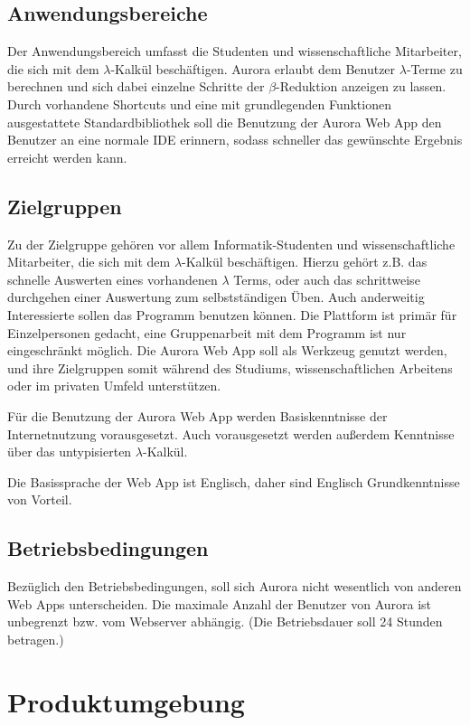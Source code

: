 \documentclass[parskip=full,11pt,twoside]{scrartcl}
\begin{document}
\subsection{Anwendungsbereiche}

Der Anwendungsbereich umfasst die Studenten und wissenschaftliche Mitarbeiter, die sich mit dem $\lambda$-Kalkül beschäftigen. Aurora erlaubt dem Benutzer $\lambda$-Terme zu berechnen und sich dabei einzelne Schritte der $\beta$-Reduktion anzeigen zu lassen. Durch vorhandene Shortcuts und eine mit grundlegenden Funktionen ausgestattete Standardbibliothek soll die Benutzung der Aurora Web App den Benutzer an eine normale IDE erinnern, sodass schneller das gewünschte Ergebnis erreicht werden kann.

\subsection{Zielgruppen}

Zu der Zielgruppe gehören vor allem Informatik-Studenten und wissenschaftliche Mitarbeiter, die sich mit dem $\lambda$-Kalkül beschäftigen. Hierzu gehört z.B. das schnelle Auswerten eines vorhandenen $\lambda$ Terms, oder auch das schrittweise durchgehen einer Auswertung zum selbstständigen Üben. Auch anderweitig Interessierte sollen das Programm benutzen können.
Die Plattform ist primär für Einzelpersonen gedacht, eine Gruppenarbeit mit dem Programm ist nur eingeschränkt möglich. Die Aurora Web App soll als Werkzeug genutzt werden, und ihre Zielgruppen somit während des Studiums, wissenschaftlichen Arbeitens oder im privaten Umfeld unterstützen.


Für die Benutzung der Aurora Web App werden Basiskenntnisse der Internetnutzung vorausgesetzt. Auch vorausgesetzt werden außerdem Kenntnisse über das untypisierten $\lambda$-Kalkül.

Die Basissprache der Web App ist Englisch, daher sind Englisch Grundkenntnisse von Vorteil.

\subsection{Betriebsbedingungen}
Bezüglich den Betriebsbedingungen, soll sich Aurora nicht wesentlich von anderen Web Apps unterscheiden. Die maximale Anzahl der Benutzer von Aurora ist unbegrenzt bzw. vom Webserver abhängig. (Die Betriebsdauer soll 24 Stunden betragen.) 


\section{Produktumgebung}
\end{document}
